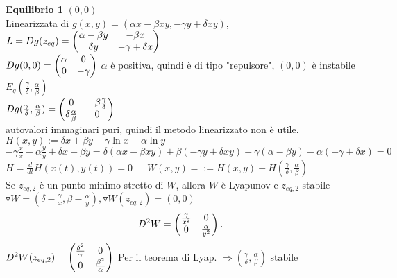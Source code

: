 \documentclass[12px]{article}
\begin{document}
 \textbf{Equilibrio 1} $(0,0)$\\
 Linearizzata di $g(x,y) = (\alpha x - \beta x y, -\gamma y + \delta x y )$,  \\$L = Dg(z_{eq}) = \begin{pmatrix}\alpha - \beta y & -\beta x\\ \delta y & -\gamma + \delta x\end{pmatrix}$\\
 $Dg(0,0) = \begin{pmatrix}\alpha & 0 \\ 0 & -\gamma\end{pmatrix}$  $\alpha$ è positiva, quindi è di tipo "repulsore", $(0,0)$ è instabile\\
 $E_q(\frac\gamma\delta,\frac\alpha\beta)$ \\
$Dg(\frac\gamma\delta, \frac\alpha\beta) = \begin{pmatrix}0 & -\beta\frac\gamma\delta\\\delta\frac\alpha\beta & 0\end{pmatrix}$\\
autovalori immaginari puri, quindi il metodo linearizzato non è utile.\\
  $H(x,y) := \delta x + \beta y-\gamma\ln x-\alpha \ln y $ \\
  $-\gamma\frac{x}{\dot x} -\alpha\frac{y}{\dot y} + \delta\dot x + \beta \dot y  = \delta (\alpha x - \beta xy) + \beta(-\gamma y + \delta xy) - \gamma(\alpha - \beta y)-\alpha(-\gamma + \delta x ) = 0$\\
  $\dot H = \frac{d}{dt} H(x(t), y(t)) =0 $\ \ \  $W(x,y) = := H(x,y) - H(\frac \gamma\delta, \frac\alpha\beta)$\\
  Se  $z_{eq,2}$ è un punto minimo stretto di  $W$, allora $W$ è Lyapunov e $z_{eq,2} $ stabile \\
  $\triangledown W = (\delta - \frac \gamma x, \beta - \frac \alpha y), \triangledown W(z_{eq,2}) = (0,0)$ 
 \\
 \[
	 D^2 W = \begin{pmatrix}\frac\gamma {x^2} & 0 \\ 0 & \frac{\alpha}{y^2}\end{pmatrix}
 .\] 
 $D^2W(z_{eq,2}) = \begin{pmatrix}\frac{\delta^2}{\gamma} & 0 \\ 0 & \frac{\beta^2}\alpha\end{pmatrix}$ Per il teorema di Lyap.  $ \Rightarrow (\frac\gamma\delta, \frac\alpha\beta)$ stabile





	
	
\end{document}
